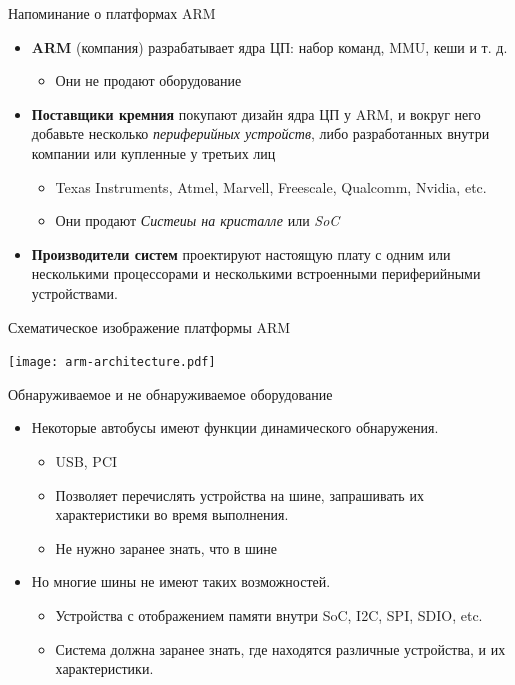 \documentclass[obeyspaces,spaces,hyphens]{beamer}
\begin{document}
\begin{frame}{Напоминание о платформах ARM}
  \begin{itemize}
  \item {\bf ARM} (компания) разрабатывает ядра ЦП: набор команд, MMU, кеши и т. д.
    \begin{itemize}
    \item Они не продают оборудование
    \end{itemize}
  \item {\bf Поставщики кремния} покупают дизайн ядра ЦП у ARM, и  вокруг него добавьте несколько {\em периферийных устройств}, либо разработанных  внутри компании или купленные у третьих лиц
    \begin{itemize}
    \item Texas Instruments, Atmel, Marvell, Freescale, Qualcomm,
      Nvidia, etc.
    \item Они продают {\em Систеиы на кристалле} или {\em SoC}
    \end{itemize}
  \item {\bf Производители систем} проектируют настоящую плату с одним или несколькими процессорами и несколькими встроенными периферийными устройствами.
  \end{itemize}
\end{frame}

\begin{frame}{Схематическое изображение платформы ARM}
  \begin{center}
    \texttt{[image: arm-architecture.pdf]}
  \end{center}
\end{frame}

\begin{frame}{Обнаруживаемое и не обнаруживаемое оборудование}
  \begin{itemize}
  \item Некоторые автобусы имеют функции динамического обнаружения.
    \begin{itemize}
    \item USB, PCI
    \item Позволяет перечислять устройства на шине, запрашивать их характеристики во время выполнения.
    \item Не нужно заранее знать, что в шине
    \end{itemize}
  \item Но многие шины не имеют таких возможностей.
    \begin{itemize}
    \item Устройства с отображением памяти внутри SoC, I2C, SPI, SDIO, etc.
    \item Система должна заранее знать, где находятся различные устройства, и их характеристики.
    \end{itemize}
  \end{itemize}
\end{frame}
\end{document}
